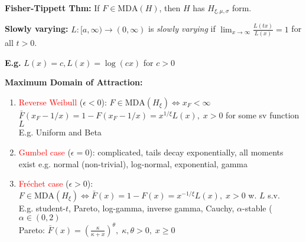 \textbf{Fisher-Tippett Thm:} If $F\in\text{MDA}(H)$, then $H$ has $H_{\xi,\mu,\sigma}$ form.

\textbf{Slowly varying:} $L:[a,\infty)\rightarrow (0,\infty)$ is \textit{slowly varying} if $\lim _{x\rightarrow \infty} \frac{L(tx)}{L(x)}=1$ for all $t>0$.

\textbf{E.g.} $L(x)=c, L(x)=\log(cx)$ for $c>0$

\textbf{Maximum Domain of Attraction:}
\begin{enumerate}
    \item \textcolor{red}{Reverse Weibull} ($\epsilon<0$): $F\in\text{MDA}(H_\xi)\iff x_F<\infty$  $\bar F (x_F-1/x)=1-F(x_F-1/x)=x^{1/\xi}L(x),\; x>0$ for some sv function $L$\\
    E.g. Uniform and Beta
    \item \textcolor{red}{Gumbel case} ($\epsilon=0$): complicated, tails decay exponentially, all moments exist e.g. normal (non-trivial), log-normal, exponential, gamma
    \item \textcolor{red}{Fréchet case} ($\epsilon>0$): $F\in\text{MDA}(H_\xi)\iff \bar F(x)=1-F(x)=x^{-1/\xi}L(x),\; x>0$ w. $L$ s.v.\\
    E.g. student-$t$, Pareto, log-gamma, inverse gamma, Cauchy, $\alpha$-stable ($\alpha\in(0,2)$\\
    Pareto: $\bar F(x) = (\frac{\kappa}{\kappa + x})^\theta,\; \kappa,\theta>0,\; x\geq 0$\\
    
\end{enumerate}

